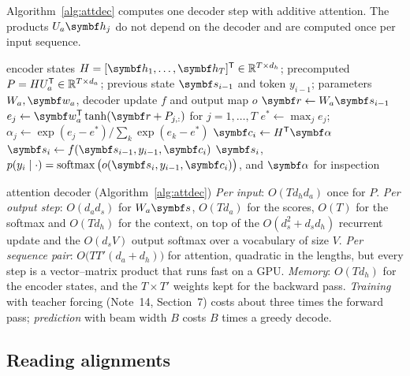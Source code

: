\documentclass[11pt]{article}
\newcommand{\hv}{\vect{h}}
\newcommand{\sv}{\vect{s}}
\newcommand{\cv}{\vect{c}}
\newcommand{\valpha}{\vect{\alpha}}
\newcommand{\softmax}{\operatorname{softmax}}
\begin{document}
Algorithm~\ref{alg:attdec} computes one decoder step with additive attention. The products $U_a\hv_j$ do not depend on
the decoder and are computed once per input sequence.

\begin{algorithm}[htbp]
\caption{One decoder step of an RNN encoder--decoder with additive attention}\label{alg:attdec}
\begin{algorithmic}[1]
\Require encoder states $H = [\hv_1, \dots, \hv_T]\T \in \R^{T \times d_h}$; precomputed $P = HU_a^{\mathsf{T}} \in \mathbb{R}^{T \times d_a}$;
  previous state $\sv_{i-1}$ and token $y_{i-1}$; parameters $W_a, \vect{w}_a$, decoder update $f$ and output map $o$
\Function{AttentionStep}{$\sv_{i-1}, y_{i-1}$; $H, P$}
  \State $\vect{r} \gets W_a\sv_{i-1}$ 
  \State $e_j \gets \vect{w}_a\T\tanh(\vect{r} + P_{j,:})$ for $j = 1, \dots, T$ 
  \State $e^* \gets \max_j e_j$; \ $\alpha_j \gets \exp(e_j - e^*) / \sum_k \exp(e_k - e^*)$ 
  \State $\cv_i \gets H\T\valpha$ 
  \State $\sv_i \gets f(\sv_{i-1}, y_{i-1}, \cv_i)$ 
  \State \Return $\sv_i$, $p(y_i \mid \cdot) = \softmax\big(o(\sv_i, y_{i-1}, \cv_i)\big)$, and $\valpha$ for inspection
\EndFunction
\end{algorithmic}
\end{algorithm}

\begin{runtime}{attention decoder (Algorithm~\ref{alg:attdec})}
\emph{Per input}: $O(Td_hd_a)$ once for $P$. \emph{Per output step}: $O(d_ad_s)$ for $W_a\sv$, $O(Td_a)$ for the scores,
$O(T)$ for the softmax and $O(Td_h)$ for the context, on top of the $O(d_s^2 + d_sd_h)$ recurrent update and the
$O(d_sV)$ output softmax over a vocabulary of size $V$. \emph{Per sequence pair}: $O\big(TT'(d_a + d_h)\big)$ for attention,
quadratic in the lengths, but every step is a vector--matrix product that runs fast on a GPU. \emph{Memory}: $O(Td_h)$ for
the encoder states, and the $T \times T'$ weights kept for the backward pass. \emph{Training} with teacher forcing
(Note~14, Section~7) costs about three times the forward pass; \emph{prediction} with beam width $B$ costs $B$ times a greedy decode.
\end{runtime}

\subsection{Reading alignments}\label{sec:alignvis}
\end{document}

